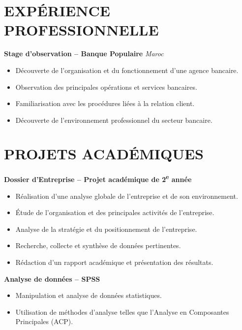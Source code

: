 \documentclass[10pt,a4paper]{article}
\begin{document}
\section{EXPÉRIENCE PROFESSIONNELLE}

\textbf{Stage d'observation -- Banque Populaire}
\hfill \textit{Maroc}

\begin{itemize}
    \item Découverte de l'organisation et du fonctionnement d'une agence bancaire.
    \item Observation des principales opérations et services bancaires.
    \item Familiarisation avec les procédures liées à la relation client.
    \item Découverte de l'environnement professionnel du secteur bancaire.
\end{itemize}

\section{PROJETS ACADÉMIQUES}

\textbf{Dossier d'Entreprise -- Projet académique de 2\textsuperscript{e} année}\begin{itemize}
    \item  Réalisation d'une analyse globale de l'entreprise et de son environnement.
    \item Étude de l'organisation et des principales activités de l'entreprise.
    \item Analyse de la stratégie et du positionnement de l'entreprise.
    \item  Recherche, collecte et synthèse de données pertinentes.
    \item Rédaction d'un rapport académique et présentation des résultats.
\end{itemize}

\vspace{2pt}

\textbf{Analyse de données -- SPSS}

\begin{itemize}
    \item Manipulation et analyse de données statistiques.
    \item Utilisation de méthodes d'analyse telles que l'Analyse en Composantes
    Principales (ACP).
\end{itemize}
\end{document}
